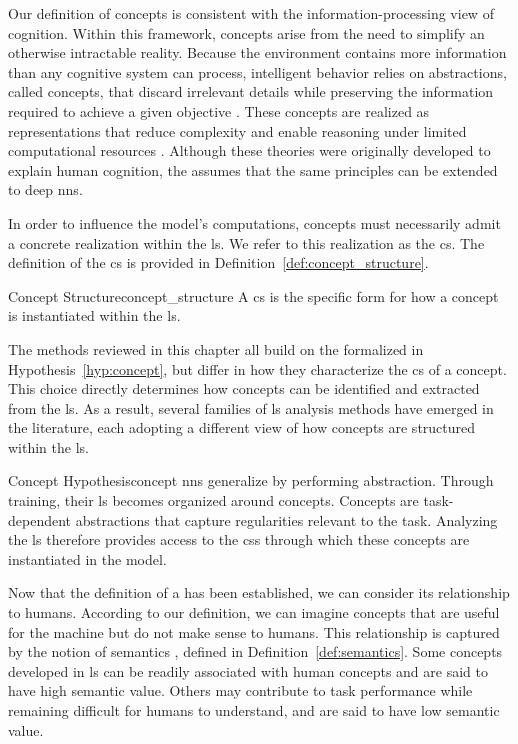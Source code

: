 Our definition of concepts is consistent with the information-processing view of cognition.
Within this framework, concepts arise from the need to simplify an otherwise intractable reality.
Because the environment contains more information than any cognitive system can process, intelligent behavior relies on abstractions, called concepts, that discard irrelevant details while preserving the information required to achieve a given objective \parencite{Peirce1878,Misak2013}.
These concepts are realized as representations that reduce complexity and enable reasoning under limited computational resources \parencite{Newell1980,Simon1996}.
Although these theories were originally developed to explain human cognition, the \ConceptHypothesisName assumes that the same principles can be extended to deep \glspl{nn}.

In order to influence the model's computations, concepts must necessarily admit a concrete realization within the \gls{ls}.
We refer to this realization as the \gls{cs}.
The definition of the \gls{cs} is provided in Definition~\ref{def:concept_structure}.

\begin{definition}{Concept Structure}{concept_structure}
A \gls{cs} is the specific form for how a concept is instantiated within the \gls{ls}.
\end{definition}

The methods reviewed in this chapter all build on the \ConceptHypothesisName formalized in Hypothesis~\ref{hyp:concept}, but differ in how they characterize the \gls{cs} of a concept.
This choice directly determines how concepts can be identified and extracted from the \gls{ls}.
As a result, several families of \gls{ls} analysis methods have emerged in the literature, each adopting a different view of how concepts are structured within the \gls{ls}.

\begin{hypothesis}{Concept Hypothesis}{concept}
\glspl{nn} generalize by performing abstraction.
Through training, their \gls{ls} becomes organized around concepts.
Concepts are task-dependent abstractions that capture regularities relevant to the task.
Analyzing the \gls{ls} therefore provides access to the \glspl{cs} through which these concepts are instantiated in the model.
\end{hypothesis}

Now that the definition of a \ConceptHypothesisName has been established, we can consider its relationship to humans.
According to our definition, we can imagine concepts that are useful for the machine but do not make sense to humans.
This relationship is captured by the notion of semantics \parencite{marconato2023interpretabilitymindbeholdercausal}, defined in Definition~\ref{def:semantics}.
Some concepts developed in \gls{ls} can be readily associated with human concepts and are said to have high semantic value.
Others may contribute to task performance while remaining difficult for humans to understand, and are said to have low semantic value.

